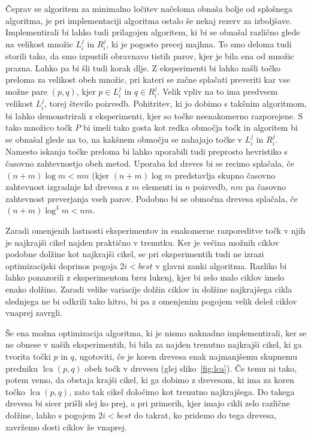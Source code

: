 \documentclass[a4paper, 12pt]{book}
\begin{document}
Čeprav se algoritem za minimalno ločitev načeloma obnaša bolje od splo\-šne\-ga algoritma, je pri implementaciji algoritma ostalo še nekaj rezerv za izboljšave. Implementirali bi lahko tudi prilagojen algoritem, ki bi se obnašal različno glede na velikost množic $L_i^j$ in $R_i^j$, ki je pogosto precej majhna. To smo deloma tudi storili tako, da smo izpustili obravnavo  tistih parov, kjer je bila ena od množic prazna. Lahko pa bi šli tudi korak dlje. Z eksperimenti bi lahko našli točko preloma za velikost obeh množic, pri kateri se začne splačati preveriti kar vse možne pare $(p,q)$, kjer $p\in L_i^j$ in $q\in R_i^j$. Velik vpliv na to ima predvsem velikost $L_i^j$, torej število poizvedb. Pohitritev, ki jo dobimo s takšnim algoritmom, bi lahko demonstrirali z eksperimenti, kjer so točke neenakomerno razporejene. S tako množico točk $P$ bi imeli tako gosta kot redka območja točk in algoritem bi se obnašal glede na to, na kakšnem območju se nahajajo točke v $L_i^j$ in $R_i^j$. Namesto iskanja točke preloma bi lahko uporabili tudi preprosto hevristiko s časovno zahtevnostjo obeh metod. Uporaba kd dreves bi se recimo splačala, če $(n+m)\log m < nm$ (kjer $(n+m)\log m$ predstavlja skupno časovno zahtevnost izgradnje kd drevesa z $m$ elementi in $n$ poizvedb, $nm$ pa časovno zahtevnost preverjanja vseh parov. Podobno bi se območna drevesa splačala, če $(n+m)\log^3 m < nm$.

Zaradi omenjenih lastnosti eksperimentov in enakomerne razporeditve točk v njih je najkrajši cikel najden praktično v trenutku. Ker je večina možnih ciklov podobne dolžine kot najkrajši cikel, se pri eksperimentih tudi ne izrazi optimizacijski doprinos pogoja $2i < best$ v glavni zanki algoritma. Razliko bi lahko ponazorili z eksperimentom brez lukenj, kjer bi zelo malo ciklov imelo enako dolžino. Zaradi velike variacije dolžin ciklov in dolžine najkrajšega cikla slednjega ne bi odkrili tako hitro, bi pa z omenjenim pogojem velik delež ciklov vnaprej zavrgli.

Še ena možna optimizacija algoritma, ki je nismo naknadno implementirali, ker se ne obnese v naših eksperimentih, bi bila za najden trenutno najkrajši cikel, ki ga tvorita točki $p$ in $q$, ugotoviti, če je koren drevesa enak najmanjšemu skupnemu predniku $\operatorname{lca}(p,q)$ obeh točk v drevesu (glej sliko~\ref{fig:lca}). Če temu ni tako, potem vemo, da obstaja krajši cikel, ki ga dobimo z drevesom, ki ima za koren točko $\operatorname{lca}(p,q)$, zato tak cikel določimo kot trenutno najkrajšega. Do takega drevesa bi sicer prišli slej ko prej, a pri primerih, kjer imajo cikli zelo različne dolžine, lahko s pogojem $2i < best$ do takrat, ko pridemo do tega drevesa, zavržemo dosti ciklov že vnaprej.
\end{document}
